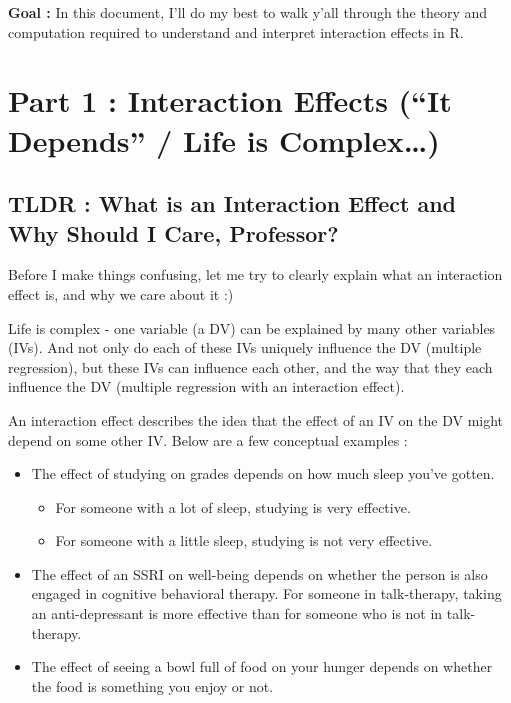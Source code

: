 \documentclass[
  letterpaper,
  DIV=11,
  numbers=noendperiod,
  oneside]{scrreprt}
\begin{document}
\textbf{Goal :} In this document, I'll do my best to walk y'all through
the theory and computation required to understand and interpret
interaction effects in R.

\chapter{Part 1 : Interaction Effects (``It Depends'' / Life is
Complex\ldots)}\label{part-1-interaction-effects-it-depends-life-is-complex}

\section{TLDR : What is an Interaction Effect and Why Should I Care,
Professor?}\label{tldr-what-is-an-interaction-effect-and-why-should-i-care-professor}

Before I make things confusing, let me try to clearly explain what an
interaction effect is, and why we care about it :)

Life is complex - one variable (a DV) can be explained by many other
variables (IVs). And not only do each of these IVs uniquely influence
the DV (multiple regression), but these IVs can influence each other,
and the way that they each influence the DV (multiple regression with an
interaction effect).~

An interaction effect describes the idea that the effect of an IV on the
DV might depend on some other IV. Below are a few conceptual examples :~

\begin{itemize}
\item
  The effect of studying on grades depends on how much sleep you've
  gotten.

  \begin{itemize}
  \item
    For someone with a lot of sleep, studying is very effective.
  \item
    For someone with a little sleep, studying is not very effective.
  \end{itemize}
\item
  The effect of an SSRI on well-being depends on whether the person is
  also engaged in cognitive behavioral therapy. For someone in
  talk-therapy, taking an anti-depressant is more effective than for
  someone who is not in talk-therapy.~
\item
  The effect of seeing a bowl full of food on your hunger depends on
  whether the food is something you enjoy or not.
\end{itemize}
\end{document}
